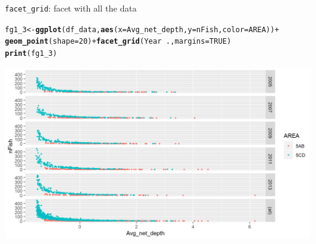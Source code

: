 \documentclass{beamer}\usepackage[]{graphicx}\usepackage[]{color}
\makeatletter
\newcommand{\hlnum}[1]{\textcolor[rgb]{0.686,0.059,0.569}{#1}}%
\newcommand{\hlopt}[1]{\textcolor[rgb]{0,0,0}{#1}}%
\newcommand{\hlstd}[1]{\textcolor[rgb]{0.345,0.345,0.345}{#1}}%
\newcommand{\hlkwb}[1]{\textcolor[rgb]{0.69,0.353,0.396}{#1}}%
\newcommand{\hlkwc}[1]{\textcolor[rgb]{0.333,0.667,0.333}{#1}}%
\newcommand{\hlkwd}[1]{\textcolor[rgb]{0.737,0.353,0.396}{\textbf{#1}}}%
\newenvironment{kframe}{%
 \def\at@end@of@kframe{}%
 \ifinner\ifhmode%
  \def\at@end@of@kframe{\end{minipage}}%
  \begin{minipage}{\columnwidth}%
 \fi\fi%
 \def\FrameCommand##1{\hskip\@totalleftmargin \hskip-\fboxsep
 \colorbox{shadecolor}{##1}\hskip-\fboxsep
     \hskip-\linewidth \hskip-\@totalleftmargin \hskip\columnwidth}%
 \MakeFramed {\advance\hsize-\width
   \@totalleftmargin\z@ \linewidth\hsize
   \@setminipage}}%
 {\par\unskip\endMakeFramed%
 \at@end@of@kframe}
\newenvironment{knitrout}{}{} %
\makeatother
\begin{document}
\begin{frame}[fragile]{\lstinline{facet_grid}: facet with all the data}
\begin{knitrout}\footnotesize
{}\color{fgcolor}\begin{kframe}
\begin{alltt}
\hlstd{fg1_3} \hlkwb{<-} \hlkwd{ggplot}\hlstd{(df_data,} \hlkwd{aes}\hlstd{(}\hlkwc{x}\hlstd{=Avg_net_depth,} \hlkwc{y}\hlstd{=nFish,} \hlkwc{color}\hlstd{=AREA))} \hlopt{+}
  \hlkwd{geom_point}\hlstd{(}\hlkwc{shape}\hlstd{=}\hlnum{20}\hlstd{)} \hlopt{+} \hlkwd{facet_grid}\hlstd{(Year} \hlopt{~} \hlstd{.,} \hlkwc{margins} \hlstd{=} \hlnum{TRUE}\hlstd{)}
\hlkwd{print}\hlstd{(fg1_3)}
\end{alltt}
\end{kframe}

{\centering \includegraphics[width=.9\linewidth]{figure/facet_grid_3-1} 

}



\end{knitrout}
\end{frame}
\end{document}
